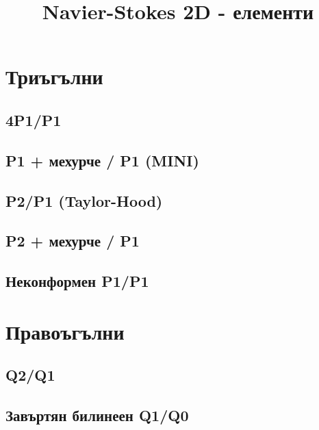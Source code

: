 \documentclass[fleqn,12pt]{article}
\title{Navier-Stokes 2D - елементи}
\begin{document}
    
\maketitle

\tableofcontents
\pagebreak

\section{Триъгълни}

\subsection{4P1/P1}

\subsection{P1 + мехурче / P1 (MINI)}

\subsection{P2/P1 (Taylor-Hood)}

\subsection{P2 + мехурче / P1}

\subsection{Неконформен P1/P1}

\section{Правоъгълни}

\subsection{Q2/Q1}

\subsection{Завъртян билинеен Q1/Q0}
\end{document}
